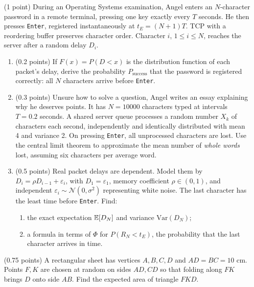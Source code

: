 \documentclass[a4paper]{report}
\begin{document}
\begin{problem} (1 point)
During an Operating Systems examination, Angel enters an $N$-character password in a remote terminal, pressing one key exactly every $T$ seconds. He then presses \texttt{Enter}, registered instantaneously at $t_E=(N+1)T$. TCP with a reordering buffer preserves character order. Character $i$, $1\leq i\leq N$, reaches the server after a random delay $D_i$.
\begin{enumerate}
\item (0.2 points) If $F(x)=P(D<x)$ is the distribution function of each packet's delay, derive the probability $P_{\mathrm{success}}$ that the password is registered correctly: all $N$ characters arrive before \texttt{Enter}.
\item (0.3 points) Unsure how to solve a question, Angel writes an essay explaining why he deserves points. It has $N=10000$ characters typed at intervals $T=0.2$ seconds. A shared server queue processes a random number $X_k$ of characters each second, independently and identically distributed with mean 4 and variance 2. On pressing \texttt{Enter}, all unprocessed characters are lost. Use the central limit theorem to approximate the mean number of \emph{whole words} lost, assuming six characters per average word.
\item (0.5 points) Real packet delays are dependent. Model them by $D_i=\rho D_{i-1}+\varepsilon_i$, with $D_1=\varepsilon_1$, memory coefficient $\rho\in(0,1)$, and independent $\varepsilon_i\sim\mathcal N(0,\sigma^2)$ representing white noise. The last character has the least time before \texttt{Enter}. Find:
\begin{enumerate}
\item the exact expectation $\mathbb {E}[D_N]$ and variance $\mathrm{Var}(D_N)$;
\item a formula in terms of $\Phi$ for $P(R_N<t_E)$, the probability that the last character arrives in time.
\end{enumerate}
\end{enumerate}
\end{problem}
\begin{problem} (0.75 points)
A rectangular sheet has vertices $A,B,C,D$ and $AD=BC=10$ cm. Points $F,K$ are chosen at random on sides $AD,CD$ so that folding along $FK$ brings $D$ onto side $AB$. Find the expected area of triangle $FKD$.
\end{problem}
\end{document}

